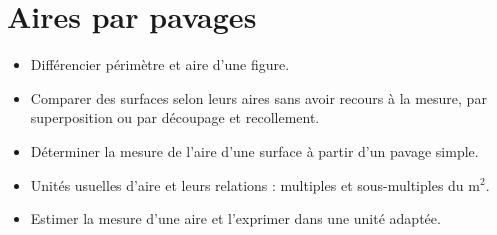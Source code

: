 \themaM
\graphicspath{{../Ch18_Aires_et_surfaces/Images/}}

\chapter{Aires par pavages}
\label{C10}


\begin{prerequis}
   \begin{itemize}
      \item Différencier périmètre et aire d’une figure.
      \item Comparer des surfaces selon leurs aires sans avoir recours à la mesure, par superposition ou par découpage et recollement.
      \item Déterminer la mesure de l’aire d’une surface à partir d’un pavage simple.
      \item Unités usuelles d’aire et leurs relations : multiples et sous-multiples du m$^2$.
      \item Estimer la mesure d’une aire et l’exprimer dans une unité adaptée.
   \end{itemize}
\end{prerequis}

\vfill

